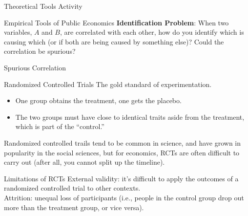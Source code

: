 \documentclass[10pt]{extarticle}
\begin{document}
  \begin{problem}{Theoretical Tools Activity}
   \begin{tcbraster}[raster columns = 1,colframe = black!75!white,colback=white]
   \end{tcbraster} 
  \end{problem}
  \begin{problem}{Empirical Tools of Public Economics}
    \textbf{Identification Problem}: When two variables, $A$ and $B$, are correlated with each other, how do you identify which is causing which (or if both are being caused by something else)? Could the correlation be spurious?
    \begin{problem}{Spurious Correlation}
      \begin{tcbraster}[raster columns = 1,colframe = black!75!white,colback=white]
      \end{tcbraster}
    \end{problem}
    \begin{problem}{Randomized Controlled Trials}
      The gold standard of experimentation.
      \begin{itemize}
        \item One group obtains the treatment, one gets the placebo.
        \item The two groups must have close to identical traits aside from the treatment, which is part of the ``control.''
      \end{itemize}
      Randomized controlled trails tend to be common in science, and have grown in popularity in the social sciences, but for economics, RCTs are often difficult to carry out (after all, you cannot split up the timeline).
      \begin{problem}{Limitations of RCTs}
        External validity: it's difficult to apply the outcomes of a randomized controlled trial to other contexts.\\

        Attrition: unequal loss of participants (i.e., people in the control group drop out more than the treatment group, or vice versa).\\


\end{problem}
\end{problem}
\end{problem}
\end{document}
